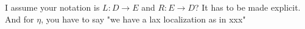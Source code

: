 I assume your notation is $ L: D\to E $ and $ R: E\to D $?
It has to be made explicit.
And for $ \eta $, you have to say "we have a lax localization as in xxx"
